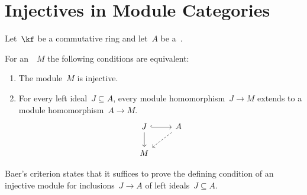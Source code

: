\section{Injectives in Module Categories}


\begin{conventionnonum}
  Let~$\kf$ be a commutative ring and let~$A$ be a~{\kalg}.
\end{conventionnonum}


\begin{theorem}
  \label{baers criterion}
  For an~{}~$M$ the following conditions are equivalent:
  \begin{enumerate}
    \item
      The module~$M$ is injective.
    \item
      \label{Baer condition}
      For every left ideal~$J \subseteq A$, every module homomorphism~$J \to M$ extends to a module homomorphism~$A \to M$.
      \[
        \begin{tikzcd}
            J
            \arrow[hook]{r}
            \arrow{d}
          & A
            \arrow[dashed]{dl}
          \\
            M
          & {}
        \end{tikzcd}
      \]
  \end{enumerate}
\end{theorem}


\begin{remark*}
  Baer’s criterion states that it suffices to prove the defining condition of an injective module for inclusions~$J \to A$ of left ideals~$J \subseteq A$.
\end{remark*}


